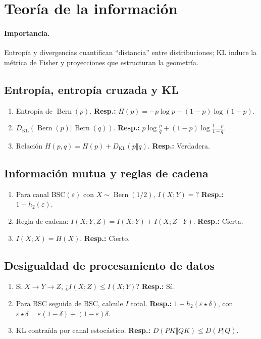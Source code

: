 	\section{Teoría de la información}
	\paragraph{Importancia.} Entropía y divergencias cuantifican “distancia” entre distribuciones; KL induce la métrica de Fisher y proyecciones que estructuran la geometría.
	
	\subsection*{Entropía, entropía cruzada y KL}
	\begin{enumerate}
		\item Entropía de $\operatorname{Bern}(p)$. \textbf{Resp.:} $H(p)=-p\log p-(1-p)\log(1-p)$.
		\item $D_{\mathrm{KL}}(\operatorname{Bern}(p)\Vert \operatorname{Bern}(q))$. \textbf{Resp.:} $p\log\frac{p}{q}+(1-p)\log\frac{1-p}{1-q}$.
		\item Relación $H(p,q)=H(p)+D_{\mathrm{KL}}(p\Vert q)$. \textbf{Resp.:} Verdadera.
	\end{enumerate}
	
	\subsection*{Información mutua y reglas de cadena}
	\begin{enumerate}
		\item Para canal BSC$(\varepsilon)$ con $X\sim\operatorname{Bern}(1/2)$, $I(X;Y)=?$ \textbf{Resp.:} $1-h_2(\varepsilon)$.
		\item Regla de cadena: $I(X;Y,Z)=I(X;Y)+I(X;Z\mid Y)$. \textbf{Resp.:} Cierta.
		\item $I(X;X)=H(X)$. \textbf{Resp.:} Cierto.
	\end{enumerate}
	
	\subsection*{Desigualdad de procesamiento de datos}
	\begin{enumerate}
		\item Si $X\to Y\to Z$, ¿$I(X;Z)\le I(X;Y)$? \textbf{Resp.:} Sí.
		\item Para BSC seguida de BSC, calcule $I$ total. \textbf{Resp.:} $1-h_2(\varepsilon\star\delta)$, con $\varepsilon\star\delta=\varepsilon(1-\delta)+(1-\varepsilon)\delta$.
		\item KL contraída por canal estocástico. \textbf{Resp.:} $D(PK\Vert QK)\le D(P\Vert Q)$.
	\end{enumerate}
	
